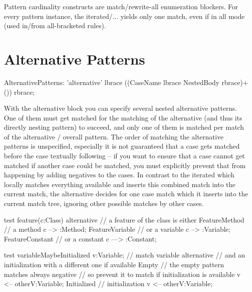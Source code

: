 \begin{warning}
Pattern cardinality constructs are match/rewrite-all enumeration blockers.
For every pattern instance, the iterated/... yields only one match, even if in all mode (used in/from all-bracketed rules).
\end{warning} 


\section{Alternative Patterns}
\label{alternative}

\begin{rail}  
  AlternativePatterns: 
    'alternative' lbrace ((CaseName lbrace NestedBody rbrace)+()) rbrace;
\end{rail}

With the alternative block you can specify several nested alternative patterns. One of them must get matched for the matching of the alternative (and thus its directly nesting pattern) to succeed, and only one of them is matched per match of the alternative / overall pattern.
The order of matching the alternative patterns is unspecified, especially it is not guaranteed that a case gets matched before the case textually following -- if you want to ensure that a case cannot get matched if another case could be matched, you must explicitly prevent that from happening by adding negatives to the cases.
In contrast to the iterated which locally matches everything available and inserts this combined match into the current match, the alternative decides for one case match which it inserts into the current match tree, ignoring other possible matches by other cases. 

\begin{example}
  \begin{grgen}
test feature(c:Class)
{
  alternative // a feature of the class is either
  {
    FeatureMethod { // a method
      c --> :Method;
    }
    FeatureVariable { // or a variable
      c --> :Variable;
    }
    FeatureConstant { // or a constant
      c ---> :Constant;
    }
  }
}  
  \end{grgen}
\end{example}

\begin{example}
  \begin{grgen}
test variableMaybeInitialized
{
  v:Variable; // match variable
  alternative { // and an initialization with a different one if available
    Empty {
      // the empty pattern matches always
      negative { // so prevent it to match if initialization is available
        v <-- otherV:Variable;
      }
    }
    Initialized { // initialization
      v <-- otherV:Variable;
    }
  }
}
  \end{grgen}
\end{example}


